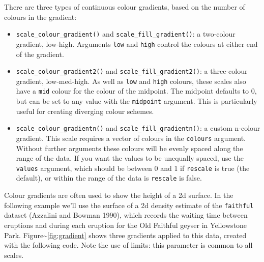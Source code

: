 There are three types of continuous colour gradients, based on the
number of colours in the gradient: 

\begin{itemize}
\itemsep1pt\parskip0pt
\item
  \texttt{scale\_colour\_gradient()} and
  \texttt{scale\_fill\_gradient()}: a two-colour gradient, low-high.
  Arguments \texttt{low} and \texttt{high} control the colours at either
  end of the gradient. 
\item
  \texttt{scale\_colour\_gradient2()} and
  \texttt{scale\_fill\_gradient2()}: a three-colour gradient,
  low-med-high. As well as \texttt{low} and \texttt{high} colours, these
  scales also have a \texttt{mid} colour for the colour of the midpoint.
  The midpoint defaults to 0, but can be set to any value with the
  \texttt{midpoint} argument. This is particularly useful for creating
  diverging colour schemes.
\item
  \texttt{scale\_colour\_gradientn()} and
  \texttt{scale\_fill\_gradientn()}: a custom n-colour gradient. This
  scale requires a vector of colours in the \texttt{colours} argument.
  Without further arguments these colours will be evenly spaced along
  the range of the data. If you want the values to be unequally spaced,
  use the \texttt{values} argument, which should be between 0 and 1 if
  \texttt{rescale} is true (the default), or within the range of the
  data is \texttt{rescale} is false.
\end{itemize}

Colour gradients are often used to show the height of a 2d surface. In
the following example we'll use the surface of a 2d density estimate of
the \texttt{faithful} dataset (Azzalini and Bowman 1990), which records
the waiting time between eruptions and during each eruption for the Old
Faithful geyser in Yellowstone Park.
Figure\textasciitilde{}\ref{fig:gradient} shows three gradients applied
to this data, created with the following code. Note the use of limits:
this parameter is common to all scales.

